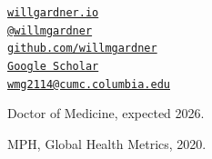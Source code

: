 \documentclass[11pt,article,oneside]{memoir}
\makeatletter
\def\myemail{wmg2114@cumc.columbia.edu}
\def\myweb{willgardner.io}
\def\mygithub{github.com/willmgardner}
\def\mygooglescholar{Google Scholar}
\def\mytwitter{@willmgardner}
\makeatother
\begin{document}
\begin{minipage}[t]{3.5in}
\end{minipage}
\hfill
\hfill
\begin{minipage}[t]{1.5in}
  \flushright \footnotesize {\texttt{\href{http://willgardner.io}{\myweb}} \, \faGlobe} \\
	{\texttt{\href{http://twitter.com/willmgardner}{\mytwitter}} \, \faTwitter}  \\
	{\texttt{\href{http://github.com/willmgardner}{\mygithub}} \, \faGithub} \\
  	{\texttt{\href{https://scholar.google.com/citations?user=LbtdQcsAAAAJ&hl=en&oi=ao}{\mygooglescholar}} \, \faGoogle} \\
  	{\texttt{\href{mailto:\myemail}{\myemail}} \, \faEnvelope} \\
\end{minipage}

\thispagestyle{empty}

\bigskip

\reversemarginpar

\bigskip




\ind Doctor of Medicine, expected 2026.

\medskip
{}

\ind MPH, Global Health Metrics, 2020.
\end{document}
